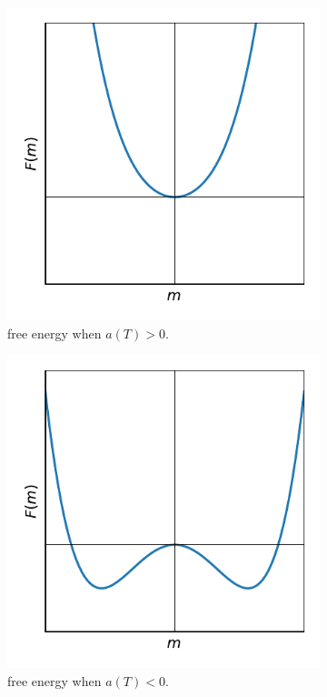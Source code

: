 \begin{itemize}
	\begin{figure}[H]
		\centering
		\begin{subfigure}{0.4\linewidth}
			\centering
			\includegraphics[scale=0.8]{figures/free energy when a(T) is greater than 0.pdf}
			\caption{free energy when $a(T) > 0$.}
		\end{subfigure}
		\begin{subfigure}{0.4\linewidth}
			\centering
			\includegraphics[scale=0.8]{figures/free energy when a(T) is less than 0.pdf}
			\caption{free energy when $a(T) < 0$.}
		\end{subfigure}
		\caption{}
	\end{figure}
	

\end{itemize}
